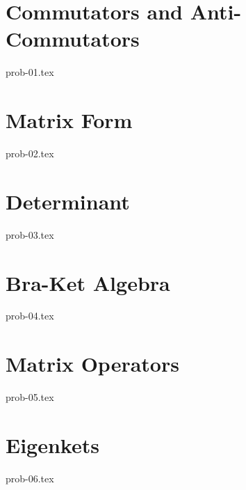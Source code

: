 \section{Commutators and Anti-Commutators}

{prob-01.tex}

\section{Matrix Form}

{prob-02.tex}

\section{Determinant}

{prob-03.tex}

\section{Bra-Ket Algebra}

{prob-04.tex}

\section{Matrix Operators}

{prob-05.tex}

\section{Eigenkets}

{prob-06.tex}

